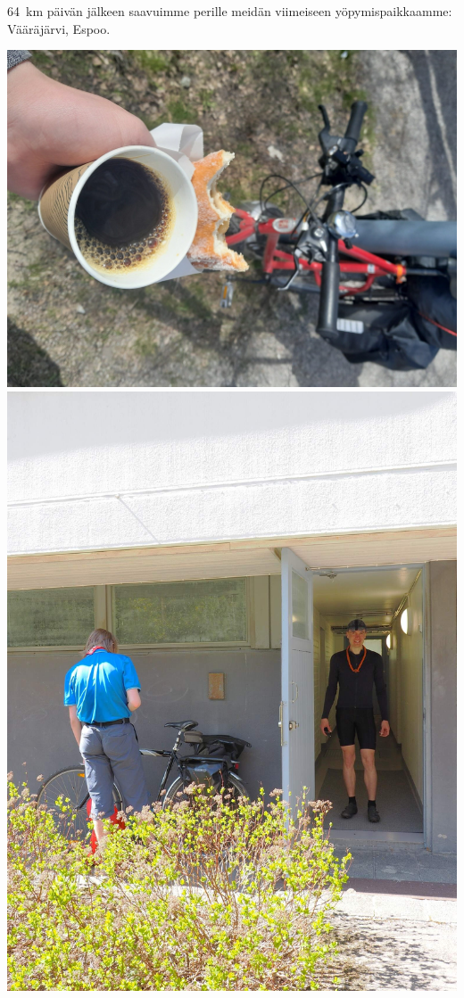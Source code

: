 \begin{multicols}{2}
\begin{center}
	\end{center}
	\begin{addmargin}[0.32cm]{0cm}
		{\small
		64~km päivän jälkeen saavuimme perille meidän viimeiseen
		yöpymispaikkaamme: Vääräjärvi, Espoo.}
	\end{addmargin}
\end{multicols}


\begin{multicols}{2}
	\begin{center}
		\noindent\includegraphics[width=1.05\linewidth]{assets/pyörävaellus25}
		\noindent\includegraphics[width=1.05\linewidth]{assets/pyörävaellus26}

\end{center}
\end{multicols}

